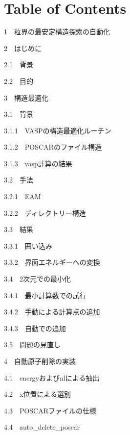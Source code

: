 \chapter{Table of Contents}\label{table-of-contents}

{1~~}粒界の最安定構造探索の自動化

{2~~}はじめに

{2.1~~}背景

{2.2~~}目的

{3~~}構造最適化

{3.1~~}背景

{3.1.1~~}VASPの構造最適化ルーチン

{3.1.2~~}POSCARのファイル構造

{3.1.3~~}vasp計算の結果

{3.2~~}手法

{3.2.1~~}EAM

{3.2.2~~}ディレクトリー構造

{3.3~~}結果

{3.3.1~~}囲い込み

{3.3.2~~}界面エネルギーへの変換

{3.4~~}2次元での最小化

{3.4.1~~}最小計算数での試行

{3.4.2~~}手動による計算点の追加

{3.4.3~~}自動での追加

{3.5~~}問題の見直し

{4~~}自動原子削除の実装

{4.1~~}energyおよびnlによる抽出

{4.2~~}x位置による選別

{4.3~~}POSCARファイルの仕様

{4.4~~}auto\_delete\_poscar

    